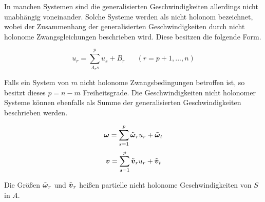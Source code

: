 In manchen Systemen sind die generalisierten Geschwindigkeiten allerdings nicht unabhängig voneinander. Solche Systeme werden als nicht holonom bezeichnet, wobei der Zusammenhang der generalisierten Geschwindigkeiten durch nicht holonome Zwangsgleichungen beschrieben wird. Diese besitzen die folgende Form.

\begin{equation}
u_r = \sum^p_{A_rs} u_s + B_r	\hspace{20pt} (r=p+1,...,n)
\end{equation}

Falls ein System von $m$ nicht holonome Zwangsbedingungen betroffen ist, so besitzt dieses $p=n-m$ Freiheitsgrade. Die Geschwindigkeiten nicht holonomer Systeme können ebenfalls als Summe der generalisierten Geschwindigkeiten beschrieben werden.

\begin{equation}
\boldsymbol{\omega} = \sum^p_{s=1}\tilde{\boldsymbol{\omega}}_r u_r + \tilde{\boldsymbol{\omega}}_t
\end{equation}
\begin{equation}
\boldsymbol{v} = \sum^p_{s=1}\tilde{\boldsymbol{v}}_r u_r + \tilde{\boldsymbol{v}}_t
\end{equation}

Die Größen $\tilde{\boldsymbol{\omega}}_r$ und $\tilde{\boldsymbol{v}}_r$ heißen partielle nicht holonome Geschwindigkeiten von $S$ in $A$.